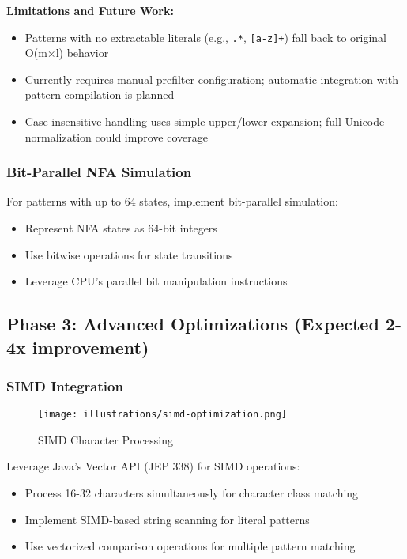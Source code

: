 \documentclass[11pt,a4paper]{article}
\begin{document}
\textbf{Limitations and Future Work:}

\begin{itemize}
\item Patterns with no extractable literals (e.g., \texttt{.*}, \texttt{[a-z]+}) fall back to original O(m×l) behavior
\item Currently requires manual prefilter configuration; automatic integration with pattern compilation is planned
\item Case-insensitive handling uses simple upper/lower expansion; full Unicode normalization could improve coverage
\end{itemize}

\subsubsection{Bit-Parallel NFA Simulation}

For patterns with up to 64 states, implement bit-parallel simulation:
\begin{itemize}
\item Represent NFA states as 64-bit integers
\item Use bitwise operations for state transitions
\item Leverage CPU's parallel bit manipulation instructions
\end{itemize}

\subsection{Phase 3: Advanced Optimizations (Expected 2-4x improvement)}

\subsubsection{SIMD Integration}

\begin{figure}[htbp]
\centering
\texttt{[image: illustrations/simd-optimization.png]}
\caption{SIMD Character Processing}
\label{fig:simd}
\end{figure}

Leverage Java's Vector API (JEP 338) for SIMD operations:
\begin{itemize}
\item Process 16-32 characters simultaneously for character class matching
\item Implement SIMD-based string scanning for literal patterns
\item Use vectorized comparison operations for multiple pattern matching
\end{itemize}
\end{document}
